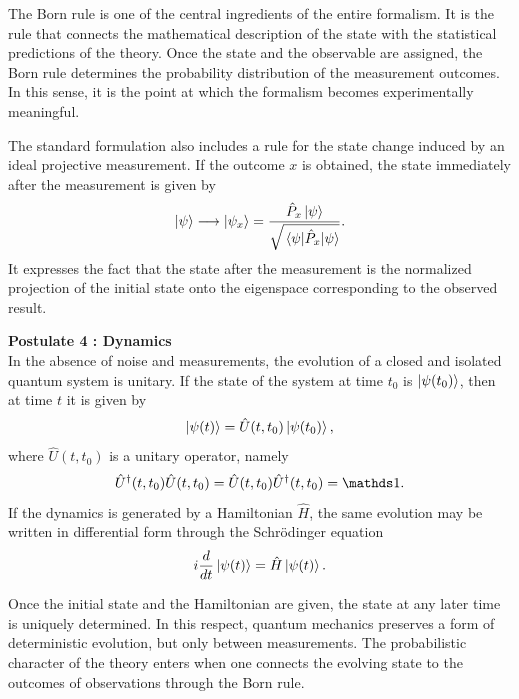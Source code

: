 The Born rule is one of the central ingredients of the entire formalism. It is the rule that connects the mathematical description of the state with the statistical predictions of the theory. Once the state and the observable are assigned, the Born rule determines the probability distribution of the measurement outcomes. In this sense, it is the point at which the formalism becomes experimentally meaningful.

The standard formulation also includes a rule for the state change induced by an ideal projective measurement. If the outcome $x$ is obtained, the state immediately after the measurement is given by
\begin{equation}
	\ket{\psi}\longrightarrow
	\ket{\psi_x}
	=
	\frac{\hat P_x\ket{\psi}}{\sqrt{\matrixel{\psi}{\hat P_x}{\psi}}}.
	\label{eq:intro_qm_projection_postulate}
\end{equation}
It expresses the fact that the state after the measurement is the normalized projection of the initial state onto the eigenspace corresponding to the observed result.

\medskip

\textbf{Postulate 4 : Dynamics}
\\
In the absence of noise and measurements, the evolution of a closed and isolated quantum system is unitary. If the state of the system at time $t_0$ is $\ket{\psi(t_0)}$, then at time $t$ it is given by
\begin{equation}
	\ket{\psi(t)}=\hat U(t,t_0)\ket{\psi(t_0)},
	\label{eq:intro_qm_unitary_evolution}
\end{equation}
where $\hat U(t,t_0)$ is a unitary operator, namely
\begin{equation}
	\hat U^\dagger(t,t_0)\hat U(t,t_0)=\hat U(t,t_0)\hat U^\dagger(t,t_0)=\id.
	\label{eq:intro_qm_unitarity_condition}
\end{equation}
If the dynamics is generated by a Hamiltonian $\hat H$, the same evolution may be written in differential form through the Schrödinger equation
\begin{equation}
	i\frac{d}{dt}\ket{\psi(t)}=\hat H\ket{\psi(t)}.
	\label{eq:intro_qm_schrodinger_equation}
\end{equation}

Once the initial state and the Hamiltonian are given, the state at any later time is uniquely determined. In this respect, quantum mechanics preserves a form of deterministic evolution, but only between measurements. The probabilistic character of the theory enters when one connects the evolving state to the outcomes of observations through the Born rule.

